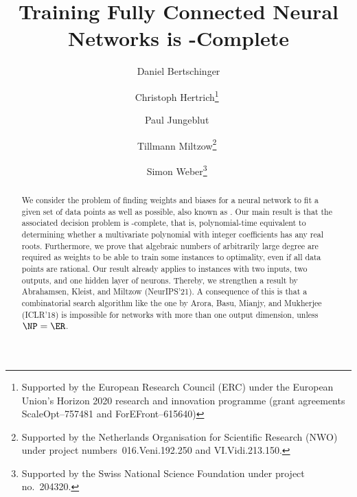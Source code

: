 \documentclass{toc}
\begin{document}
\begin{frontmatter}%

%
%
%

%
%

%
%

\title{Training Fully Connected Neural Networks is \texorpdfstring{\ER}{ER}-Complete
}
%
%
%

%
%
%
%
%
%
%
%
%
%
%
%


%
%
%
%

%

\author[bertschinger]{Daniel Bertschinger}
\author[hertrich]{Christoph Hertrich\thanks{Supported by the European Research Council (ERC) under the European Union's Horizon 2020 research and innovation programme (grant agreements ScaleOpt--757481 and ForEFront--615640)}\,\,}
\author[jungeblut]{Paul Jungeblut\,\,}
\author[miltzow]{Tillmann Miltzow\thanks{Supported by the Netherlands Organisation for Scientific Research (NWO) under project numbers~016.Veni.192.250 and VI.Vidi.213.150.}\,\,}
\author[weber]{Simon Weber\thanks{Supported by the Swiss National Science Foundation under project no.~204320.}\,\,}

%
%
%
%
%
%
%
%
\begin{abstract}
    We consider the problem of finding weights and biases for a \twolayer \fullyconnected 
neural network to fit a given set of data points as well as possible, also known as \ERM.
    Our main result is that the associated decision problem is \ER-complete, that is, 
polynomial-time equivalent to determining whether a multivariate polynomial with integer
coefficients has any real roots.
Furthermore, we prove that algebraic numbers of arbitrarily large degree are required
as weights to be able to train some instances to optimality, even if all data points
are rational.
    Our result already applies to \fullyconnected
    instances with two inputs, two outputs, and  one hidden layer of \ReLU neurons. 
    Thereby, we strengthen a result by Abrahamsen, Kleist, and Miltzow (NeurIPS'21).
    A consequence of this is that a combinatorial search algorithm like the one by Arora,
Basu, Mianjy, and Mukherjee (ICLR'18) is impossible for networks with more than one output
dimension, unless $\NP = \ER$.
\end{abstract}

%

\end{frontmatter}
\end{document}
